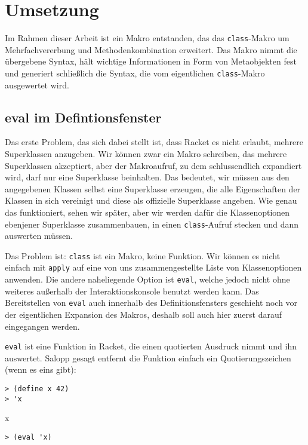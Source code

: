 \chapter{Umsetzung}  
\label{implementation}
Im Rahmen dieser Arbeit ist ein Makro entstanden, das das \texttt{class}-Makro um Mehrfachvererbung und Methodenkombination erweitert. Das Makro nimmt die übergebene Syntax, hält wichtige Informationen in Form von Metaobjekten fest und generiert schließlich die Syntax, die vom eigentlichen \texttt{class}-Makro ausgewertet wird.

\section{eval im Defintionsfenster}

Das erste Problem, das sich dabei stellt ist, dass Racket es nicht erlaubt, mehrere Superklassen anzugeben. Wir können zwar ein Makro schreiben, das mehrere Superklassen akzeptiert, aber der Makroaufruf, zu dem schlussendlich expandiert wird, darf nur eine Superklasse beinhalten. Das bedeutet, wir müssen aus den angegebenen Klassen selbst eine Superklasse erzeugen, die alle Eigenschaften der Klassen in sich vereinigt und diese als offizielle Superklasse angeben. Wie genau das funktioniert, sehen wir später, aber wir werden dafür die Klassenoptionen ebenjener Superklasse zusammenbauen, in einen \texttt{class}-Aufruf stecken und dann auswerten müssen.

Das Problem ist: \texttt{class} ist ein Makro, keine Funktion. Wir können es nicht einfach mit \texttt{apply} auf eine von uns zusammengestellte Liste von Klassenoptionen anwenden. Die andere naheliegende Option ist \texttt{eval}, welche jedoch nicht ohne weiteres außerhalb der Interaktionskonsole benutzt werden kann. Das Bereitstellen von \texttt{eval} auch innerhalb des Definitionsfensters geschieht noch vor der eigentlichen Expansion des Makros, deshalb soll auch hier zuerst darauf eingegangen werden.

\texttt{eval} ist eine Funktion in Racket, die einen quotierten Ausdruck nimmt und ihn auswertet. Salopp gesagt entfernt die Funktion einfach ein Quotierungszeichen (wenn es eins gibt):

\begin{lstlisting}
> (define x 42)
> 'x
\end{lstlisting}
{\rsymbol x}

\begin{lstlisting}
> (eval 'x)
\end{lstlisting}
{}

